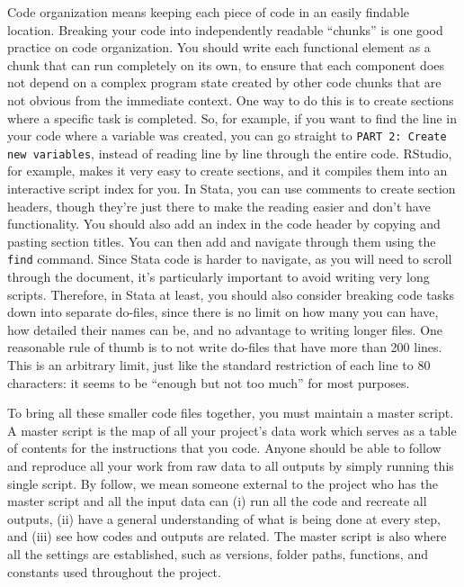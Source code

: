 Code organization means keeping each piece of code in an easily findable location.
Breaking your code into independently readable ``chunks'' is one good practice on code organization.
You should write each functional element as a chunk that can run completely on its own,
to ensure that each component does not depend on a complex program state
created by other code chunks that are not obvious from the immediate context.
One way to do this is to create sections where a specific task is completed.
So, for example, if you want to find the line in your code where a variable was created,
you can go straight to \texttt{PART 2: Create new variables},
instead of reading line by line through the entire code.
RStudio, for example, makes it very easy to create sections,
and it compiles them into an interactive script index for you.
In Stata, you can use comments to create section headers,
though they're just there to make the reading easier and don't have functionality.
You should also add an index in the code header by copying and pasting section titles.
You can then add and navigate through them using the \texttt{find} command.
Since Stata code is harder to navigate, as you will need to scroll through the document,
it's particularly important to avoid writing very long scripts.
Therefore, in Stata at least, you should also consider breaking code tasks down
into separate do-files, since there is no limit on how many you can have,
how detailed their names can be, and no advantage to writing longer files.
One reasonable rule of thumb is to not write do-files that have more than 200 lines.
This is an arbitrary limit, just like the standard restriction of each line to 80 characters:
it seems to be ``enough but not too much'' for most purposes.

To bring all these smaller code files together, you must maintain a master script.
A master script is the map of all your project's data work
which serves as a table of contents for the instructions that you code.
Anyone should be able to follow and reproduce all your work from
raw data to all outputs by simply running this single script.
By follow, we mean someone external to the project who has the master script and all the input data can
(i) run all the code and recreate all outputs,
(ii) have a general understanding of what is being done at every step, and
(iii) see how codes and outputs are related.
The master script is also where all the settings are established,
such as versions, folder paths, functions, and constants used throughout the project.

